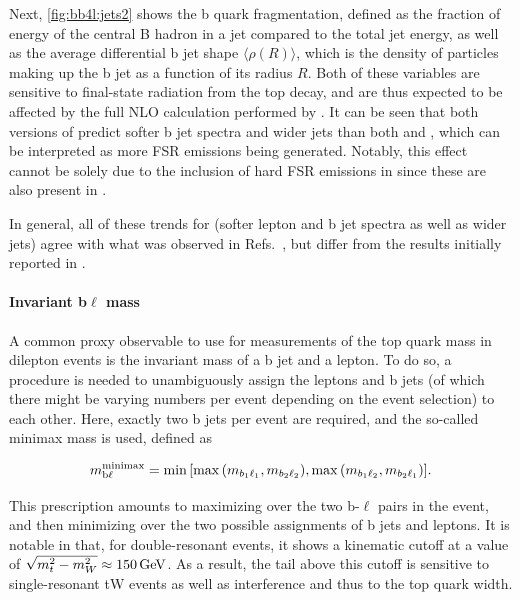 Next, \cref{fig:bb4l:jets2} shows the b quark fragmentation, defined as the fraction of energy of the central B hadron in a jet compared to the total jet energy, as well as the average differential b jet shape $\langle \rho (R) \rangle$, which is the density of particles making up the b jet as a function of its radius $R$. Both of these variables are sensitive to final-state radiation from the top decay, and are thus expected to be affected by the full NLO calculation performed by \bbfourl. It can be seen that both versions of \bbfourl predict softer b jet spectra and wider jets than both \tttWsum and \ttb, which can be interpreted as more FSR emissions being generated. Notably, this effect cannot be solely due to the inclusion of hard FSR emissions in \bbfourl since these are also present in \ttb.

In general, all of these trends for \bbfourl (softer lepton and b jet spectra as well as wider jets) agree with what was observed in Refs.~\cite{FerrarioRavasio:2018whr,ATLAS:PHYS-PUB-2021-042}, but differ from the results initially reported in .

\paragraph{Invariant b$\ell$ mass} A common proxy observable to use for measurements of the top quark mass in dilepton events is the invariant mass \mbl of a b jet and a lepton. To do so, a procedure is needed to unambiguously assign the leptons and b jets (of which there might be varying numbers per event depending on the event selection) to each other. Here, exactly two b jets per event are required, and the so-called minimax mass is used, defined as

\begin{equation}
    m_{\mathrm{b \ell}}^{\mathrm{minimax}} = \min{ \left[  \max{ \left( m_{b_1 \ell_1},
          m_{b_2 \ell_2} \right) }, \max{ \left( m_{b_1 \ell_2},
          m_{b_2 \ell_1} \right) } \right] }.
\end{equation}

This prescription amounts to maximizing over the two b-$\ell$ pairs in the event, and then minimizing over the two possible assignments of b jets and leptons. It is notable in that, for double-resonant \ttbar events, it shows a kinematic cutoff at a value of $\sqrt{\smash[b]{m_t^2 - m_W^2}} \approx \SI{150}{\GeV}$. As a result, the tail above this cutoff is sensitive to single-resonant tW events as well as \tttW interference and thus to the top quark width.

